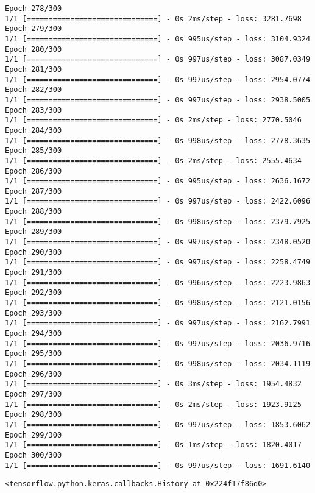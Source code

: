 \documentclass[11pt]{article}
\makeatletter
\newcommand{\boxspacing}{\kern\kvtcb@left@rule\kern\kvtcb@boxsep}
\newcommand{\prompt}[4]{
        \ttfamily\llap{{\color{#2}[#3]:\hspace{3pt}#4}}\vspace{-\baselineskip}
    }
\makeatother
\begin{document}
\begin{Verbatim}[commandchars=\\\{\}]
Epoch 278/300
1/1 [==============================] - 0s 2ms/step - loss: 3281.7698
Epoch 279/300
1/1 [==============================] - 0s 995us/step - loss: 3104.9324
Epoch 280/300
1/1 [==============================] - 0s 997us/step - loss: 3087.0349
Epoch 281/300
1/1 [==============================] - 0s 997us/step - loss: 2954.0774
Epoch 282/300
1/1 [==============================] - 0s 997us/step - loss: 2938.5005
Epoch 283/300
1/1 [==============================] - 0s 2ms/step - loss: 2770.5046
Epoch 284/300
1/1 [==============================] - 0s 998us/step - loss: 2778.3635
Epoch 285/300
1/1 [==============================] - 0s 2ms/step - loss: 2555.4634
Epoch 286/300
1/1 [==============================] - 0s 995us/step - loss: 2636.1672
Epoch 287/300
1/1 [==============================] - 0s 997us/step - loss: 2422.6096
Epoch 288/300
1/1 [==============================] - 0s 998us/step - loss: 2379.7925
Epoch 289/300
1/1 [==============================] - 0s 997us/step - loss: 2348.0520
Epoch 290/300
1/1 [==============================] - 0s 997us/step - loss: 2258.4749
Epoch 291/300
1/1 [==============================] - 0s 996us/step - loss: 2223.9863
Epoch 292/300
1/1 [==============================] - 0s 998us/step - loss: 2121.0156
Epoch 293/300
1/1 [==============================] - 0s 997us/step - loss: 2162.7991
Epoch 294/300
1/1 [==============================] - 0s 997us/step - loss: 2036.9716
Epoch 295/300
1/1 [==============================] - 0s 998us/step - loss: 2034.1119
Epoch 296/300
1/1 [==============================] - 0s 3ms/step - loss: 1954.4832
Epoch 297/300
1/1 [==============================] - 0s 2ms/step - loss: 1923.9125
Epoch 298/300
1/1 [==============================] - 0s 997us/step - loss: 1853.6062
Epoch 299/300
1/1 [==============================] - 0s 1ms/step - loss: 1820.4017
Epoch 300/300
1/1 [==============================] - 0s 997us/step - loss: 1691.6140
    \end{Verbatim}

            \begin{tcolorbox}[breakable, size=fbox, boxrule=.5pt, pad at break*=1mm, opacityfill=0]
\prompt{Out}{outcolor}{75}{\boxspacing}
\begin{Verbatim}[commandchars=\\\{\}]
<tensorflow.python.keras.callbacks.History at 0x224f17f86d0>
\end{Verbatim}
\end{tcolorbox}
        
\end{document}
